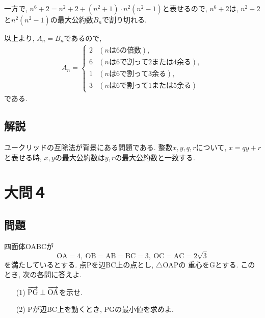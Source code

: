 \documentclass[dvipdfmx,a4paper]{jsarticle}
\begin{document}
    一方で, $n^6+2 = n^2+2 + (n^2+1) \cdot n^2(n^2-1)$と表せるので, 
    $n^6+2$は, $n^2+2$と$n^2(n^2-1)$の最大公約数$B_n$で割り切れる. 

    以上より, $A_n = B_n$であるので, 
    \begin{eqnarray*}
        A_n = \left\{
            \begin{array}{lll}
                2 & (n\mathrm{は6の倍数}), \\
                6 & (n\mathrm{は6で割って2または4余る}), \\
                1 & (n\mathrm{は6で割って3余る}), \\
                3 & (n\mathrm{は6で割って1または5余る})
            \end{array}
        \right.
    \end{eqnarray*}
    である. 


    \subsection{解説}
    ユークリッドの互除法が背景にある問題である. 整数$x,y,q,r$について, $x = qy +r$
    と表せる時, $x,y$の最大公約数は$y,r$の最大公約数と一致する. 


    \section{大問４}
    \subsection{問題}
    四面体OABCが
    \begin{equation*}
        \mathrm{
            OA = 4,\ OB=AB=BC=3,\ OC=AC=2\sqrt{3}
        }
    \end{equation*}
    を満たしているとする. 点Pを辺BC上の点とし, $\triangle \mathrm{OAP}$の
    重心をGとする. このとき, 次の各問に答えよ. 
    \begin{itemize}
        \item [(1)] $\overrightarrow{\mathrm{PG}} \perp \overrightarrow{\mathrm{OA}}$を示せ. 
        \item [(2)] Pが辺BC上を動くとき, PGの最小値を求めよ. 
    \end{itemize}
\end{document}
